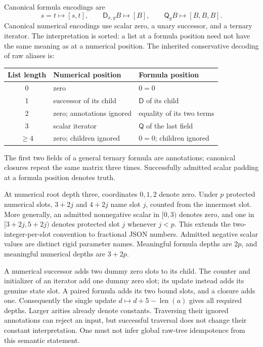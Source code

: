 \documentclass[11pt,letterpaper]{article}
\theoremstyle{definition}\newtheorem{definition}[theorem]{Definition}
\theoremstyle{remark}\newtheorem{remark}[theorem]{Remark}
\newcommand{\D}{\mathsf D}
\newcommand{\Q}{\mathsf Q}
\begin{document}
Canonical formula encodings are
\[
  s=t\longmapsto[s,t],\qquad
  \D_{x,y}B\longmapsto[B],\qquad
  \Q_yB\longmapsto[B,B,B].
\]
Canonical numerical encodings use scalar zero, a unary successor, and
a ternary iterator. The interpretation is sorted: a list at a formula
position need not have the same meaning as at a numerical position.
The inherited conservative decoding of raw aliases is:
\begin{center}
\small
\begin{tabular}{cll}
\toprule
List length & Numerical position & Formula position\\
\midrule
0 & zero & $0=0$\\
1 & successor of its child & $\D$ of its child\\
2 & zero; annotations ignored & equality of its two terms\\
3 & scalar iterator & $\Q$ of the last field\\
$\geq4$ & zero; children ignored & $0=0$; children ignored\\
\bottomrule
\end{tabular}
\end{center}
The first two fields of a general ternary formula are annotations;
canonical closures repeat the same matrix three times. Successfully
admitted scalar padding at a formula position denotes truth.

At numerical root depth three, coordinates $0,1,2$ denote zero. Under
$p$ protected numerical slots, $3+2j$ and $4+2j$ name slot $j$, counted
from the innermost slot. More generally, an admitted nonnegative scalar
in $[0,3)$ denotes zero, and one in $[3+2j,5+2j)$ denotes protected
slot $j$ whenever $j<p$. This extends the two-integer-per-slot convention
to fractional JSON numbers. Admitted negative scalar values are distinct
rigid parameter names. Meaningful formula depths are $2p$, and meaningful
numerical depths are $3+2p$.

A numerical successor adds two dummy zero slots to its child. The
counter and initializer of an iterator add one dummy zero slot; its
update instead adds its genuine state slot. A paired formula adds its
two bound slots, and a closure adds one. Consequently the single update
$d\mapsto d+5-\operatorname{len}(a)$ gives all required depths. Larger
arities already denote constants. Traversing their ignored annotations
can reject an input, but successful traversal does not change their
constant interpretation. One must not infer global raw-tree
idempotence from this semantic statement.
\end{document}
